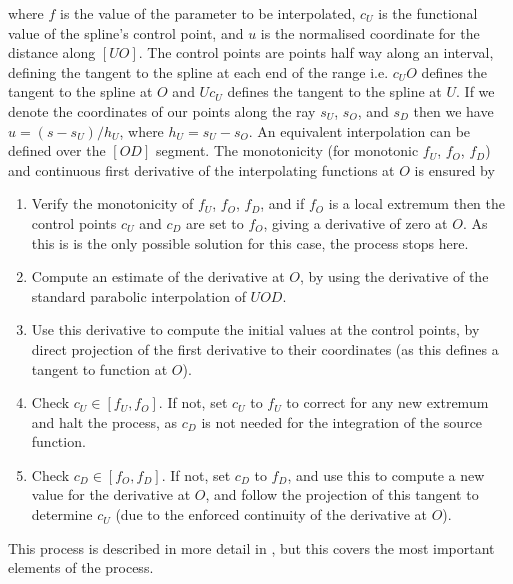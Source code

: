 where $f$ is the value of the parameter to be interpolated, $c_U$ is the functional value of the spline's control point, and $u$ is the normalised coordinate for the distance along $[UO]$.
The control points are points half way along an interval, defining the tangent to the spline at each end of the range i.e. $c_U O$ defines the tangent to the spline at $O$ and $U c_U$ defines the tangent to the spline at $U$.
If we denote the coordinates of our points along the ray $s_U$, $s_O$, and $s_D$ then we have $u = (s - s_U) / h_U$, where $h_U = s_U - s_O$.
An equivalent interpolation can be defined over the $[OD]$ segment.
The monotonicity (for monotonic $f_U$, $f_O$, $f_D$) and continuous first derivative of the interpolating functions at $O$ is ensured by
\begin{enumerate}
    \item Verify the monotonicity of $f_U$, $f_O$, $f_D$, and if $f_O$ is a local extremum then the control points $c_U$ and $c_D$ are set to $f_O$, giving a derivative of zero at $O$. As this is is the only possible solution for this case, the process stops here.

    \item Compute an estimate of the derivative at $O$, by using the derivative of the standard parabolic interpolation of $UOD$.

    \item Use this derivative to compute the initial values at the control points, by direct projection of the first derivative to their coordinates (as this defines a tangent to function at $O$).

    \item Check $c_U \in [f_U, f_O]$. If not, set $c_U$ to $f_U$ to correct for any new extremum and halt the process, as $c_D$ is not needed for the integration of the source function.

    \item Check $c_D \in [f_O, f_D]$. If not, set $c_D$ to $f_D$, and use this to compute a new value for the derivative at $O$, and follow the projection of this tangent to determine $c_U$ (due to the enforced continuity of the derivative at $O$).
\end{enumerate}
This process is described in more detail in \citet{Stepan2013}, but this covers the most important elements of the process.


